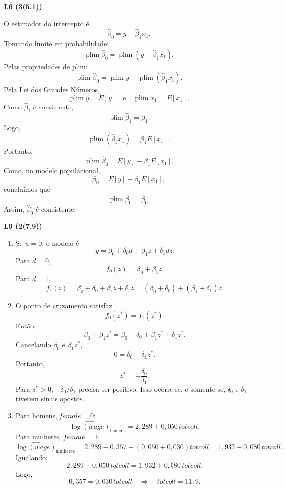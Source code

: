 \documentclass[12pt,letterpaper,onecolumn]{exam}
\begin{document}
\begin{questions}
\vspace{0.8cm}

\question \textbf{L6 (3(5.1))}

O estimador do intercepto é
\[
\hat{\beta}_0=\bar{y}-\hat{\beta}_1\bar{x}_1.
\]
Tomando limite em probabilidade:
\[
\operatorname{plim}\hat{\beta}_0
=
\operatorname{plim}(\bar{y}-\hat{\beta}_1\bar{x}_1).
\]
Pelas propriedades de plim:
\[
\operatorname{plim}\hat{\beta}_0
=
\operatorname{plim}\bar{y}
-
\operatorname{plim}(\hat{\beta}_1\bar{x}_1).
\]
Pela Lei dos Grandes Números,
\[
\operatorname{plim}\bar{y}=E[y]
\quad\text{e}\quad
\operatorname{plim}\bar{x}_1=E[x_1].
\]
Como \(\hat{\beta}_1\) é consistente,
\[
\operatorname{plim}\hat{\beta}_1=\beta_1.
\]
Logo,
\[
\operatorname{plim}(\hat{\beta}_1\bar{x}_1)
=
\beta_1E[x_1].
\]
Portanto,
\[
\operatorname{plim}\hat{\beta}_0
=
E[y]-\beta_1E[x_1].
\]
Como, no modelo populacional,
\[
\beta_0=E[y]-\beta_1E[x_1],
\]
concluímos que
\[
\operatorname{plim}\hat{\beta}_0=\beta_0.
\]
Assim, \(\hat{\beta}_0\) é consistente.

\vspace{0.8cm}

\question \textbf{L9 (2(7.9))}

\begin{enumerate}[label=(\roman*)]
    \item Se \(u=0\), o modelo é
    \[
    y=\beta_0+\delta_0d+\beta_1z+\delta_1dz.
    \]
    Para \(d=0\),
    \[
    f_0(z)=\beta_0+\beta_1z.
    \]
    Para \(d=1\),
    \[
    f_1(z)=\beta_0+\delta_0+\beta_1z+\delta_1z
    =
    (\beta_0+\delta_0)+(\beta_1+\delta_1)z.
    \]

    \item O ponto de cruzamento satisfaz
    \[
    f_0(z^\ast)=f_1(z^\ast).
    \]
    Então,
    \[
    \beta_0+\beta_1z^\ast
    =
    \beta_0+\delta_0+\beta_1z^\ast+\delta_1z^\ast.
    \]
    Cancelando \(\beta_0\) e \(\beta_1z^\ast\),
    \[
    0=\delta_0+\delta_1z^\ast.
    \]
    Portanto,
    \[
    z^\ast=-\frac{\delta_0}{\delta_1}.
    \]
    Para \(z^\ast>0\), \(-\delta_0/\delta_1\) precisa ser positivo. Isso ocorre se, e somente se, \(\delta_0\) e \(\delta_1\) tiverem sinais opostos.

    \item Para homens, \(\textit{female}=0\):
    \[
    \widehat{\log(wage)}_{\text{homens}}
    =
    2{,}289+0{,}050\,totcoll.
    \]
    Para mulheres, \(\textit{female}=1\):
    \[
    \widehat{\log(wage)}_{\text{mulheres}}
    =
    2{,}289-0{,}357+(0{,}050+0{,}030)totcoll
    =
    1{,}932+0{,}080\,totcoll.
    \]
    Igualando:
    \[
    2{,}289+0{,}050\,totcoll
    =
    1{,}932+0{,}080\,totcoll.
    \]
    Logo,
    \[
    0{,}357=0{,}030\,totcoll
    \quad\Rightarrow\quad
    totcoll=11{,}9.
    \]


\end{enumerate}
\end{questions}
\end{document}
